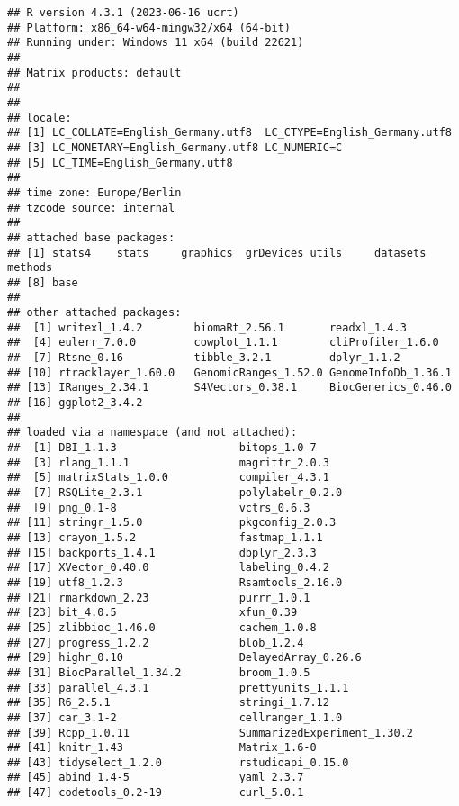 \documentclass[
]{article}
\begin{document}
\begin{verbatim}
## R version 4.3.1 (2023-06-16 ucrt)
## Platform: x86_64-w64-mingw32/x64 (64-bit)
## Running under: Windows 11 x64 (build 22621)
## 
## Matrix products: default
## 
## 
## locale:
## [1] LC_COLLATE=English_Germany.utf8  LC_CTYPE=English_Germany.utf8   
## [3] LC_MONETARY=English_Germany.utf8 LC_NUMERIC=C                    
## [5] LC_TIME=English_Germany.utf8    
## 
## time zone: Europe/Berlin
## tzcode source: internal
## 
## attached base packages:
## [1] stats4    stats     graphics  grDevices utils     datasets  methods  
## [8] base     
## 
## other attached packages:
##  [1] writexl_1.4.2        biomaRt_2.56.1       readxl_1.4.3        
##  [4] eulerr_7.0.0         cowplot_1.1.1        cliProfiler_1.6.0   
##  [7] Rtsne_0.16           tibble_3.2.1         dplyr_1.1.2         
## [10] rtracklayer_1.60.0   GenomicRanges_1.52.0 GenomeInfoDb_1.36.1 
## [13] IRanges_2.34.1       S4Vectors_0.38.1     BiocGenerics_0.46.0 
## [16] ggplot2_3.4.2       
## 
## loaded via a namespace (and not attached):
##  [1] DBI_1.1.3                   bitops_1.0-7               
##  [3] rlang_1.1.1                 magrittr_2.0.3             
##  [5] matrixStats_1.0.0           compiler_4.3.1             
##  [7] RSQLite_2.3.1               polylabelr_0.2.0           
##  [9] png_0.1-8                   vctrs_0.6.3                
## [11] stringr_1.5.0               pkgconfig_2.0.3            
## [13] crayon_1.5.2                fastmap_1.1.1              
## [15] backports_1.4.1             dbplyr_2.3.3               
## [17] XVector_0.40.0              labeling_0.4.2             
## [19] utf8_1.2.3                  Rsamtools_2.16.0           
## [21] rmarkdown_2.23              purrr_1.0.1                
## [23] bit_4.0.5                   xfun_0.39                  
## [25] zlibbioc_1.46.0             cachem_1.0.8               
## [27] progress_1.2.2              blob_1.2.4                 
## [29] highr_0.10                  DelayedArray_0.26.6        
## [31] BiocParallel_1.34.2         broom_1.0.5                
## [33] parallel_4.3.1              prettyunits_1.1.1          
## [35] R6_2.5.1                    stringi_1.7.12             
## [37] car_3.1-2                   cellranger_1.1.0           
## [39] Rcpp_1.0.11                 SummarizedExperiment_1.30.2
## [41] knitr_1.43                  Matrix_1.6-0               
## [43] tidyselect_1.2.0            rstudioapi_0.15.0          
## [45] abind_1.4-5                 yaml_2.3.7                 
## [47] codetools_0.2-19            curl_5.0.1                 

\end{verbatim}
\end{document}
